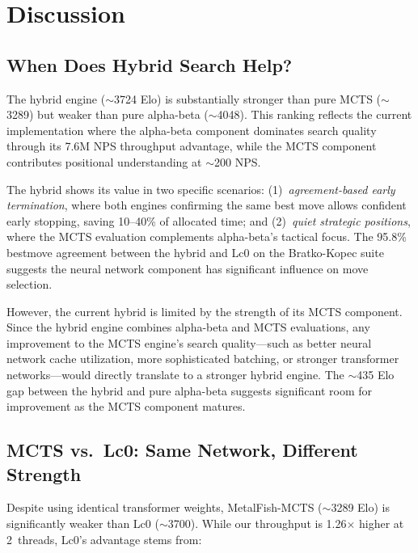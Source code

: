 \documentclass{svproc}
\begin{document}

\FloatBarrier
\section{Discussion}
\label{sec:discussion}

\subsection{When Does Hybrid Search Help?}

The hybrid engine ($\sim$3724 Elo) is substantially stronger than pure MCTS ($\sim$3289) but weaker than pure alpha-beta ($\sim$4048). This ranking reflects the current implementation where the alpha-beta component dominates search quality through its 7.6M NPS throughput advantage, while the MCTS component contributes positional understanding at $\sim$200 NPS.

The hybrid shows its value in two specific scenarios: (1)~\emph{agreement-based early termination}, where both engines confirming the same best move allows confident early stopping, saving 10--40\% of allocated time; and (2)~\emph{quiet strategic positions}, where the MCTS evaluation complements alpha-beta's tactical focus. The 95.8\% bestmove agreement between the hybrid and Lc0 on the Bratko-Kopec suite suggests the neural network component has significant influence on move selection.

However, the current hybrid is limited by the strength of its MCTS component. Since the hybrid engine combines alpha-beta and MCTS evaluations, any improvement to the MCTS engine's search quality---such as better neural network cache utilization, more sophisticated batching, or stronger transformer networks---would directly translate to a stronger hybrid engine. The $\sim$435 Elo gap between the hybrid and pure alpha-beta suggests significant room for improvement as the MCTS component matures.

\subsection{MCTS vs.\ Lc0: Same Network, Different Strength}

Despite using identical transformer weights, MetalFish-MCTS ($\sim$3289 Elo) is significantly weaker than Lc0 ($\sim$3700). While our throughput is 1.26$\times$ higher at 2~threads, Lc0's advantage stems from:
\end{document}

